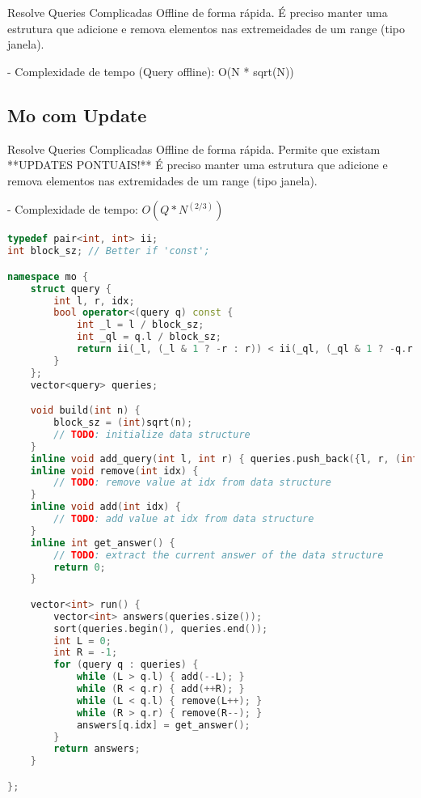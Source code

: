 \documentclass[11pt, a4paper, twoside]{article}
\begin{document}
Resolve Queries Complicadas Offline de forma rápida.  
É preciso manter uma estrutura que adicione e remova elementos nas extremeidades de um range (tipo janela).

- Complexidade de tempo (Query offline): O(N * sqrt(N))

\subsection{Mo com Update}


Resolve Queries Complicadas Offline de forma rápida.   
Permite que existam **UPDATES PONTUAIS!**  
É preciso manter uma estrutura que adicione e remova elementos nas extremidades de um range (tipo janela).

- Complexidade de tempo: $O(Q * N^(2/3))$

\begin{lstlisting}[language=C++]
typedef pair<int, int> ii;
int block_sz; // Better if 'const';

namespace mo {
    struct query {
        int l, r, idx;
        bool operator<(query q) const {
            int _l = l / block_sz;
            int _ql = q.l / block_sz;
            return ii(_l, (_l & 1 ? -r : r)) < ii(_ql, (_ql & 1 ? -q.r : q.r));
        }
    };
    vector<query> queries;

    void build(int n) {
        block_sz = (int)sqrt(n);
        // TODO: initialize data structure
    }
    inline void add_query(int l, int r) { queries.push_back({l, r, (int)queries.size()}); }
    inline void remove(int idx) {
        // TODO: remove value at idx from data structure
    }
    inline void add(int idx) {
        // TODO: add value at idx from data structure
    }
    inline int get_answer() {
        // TODO: extract the current answer of the data structure
        return 0;
    }

    vector<int> run() {
        vector<int> answers(queries.size());
        sort(queries.begin(), queries.end());
        int L = 0;
        int R = -1;
        for (query q : queries) {
            while (L > q.l) { add(--L); }
            while (R < q.r) { add(++R); }
            while (L < q.l) { remove(L++); }
            while (R > q.r) { remove(R--); }
            answers[q.idx] = get_answer();
        }
        return answers;
    }

};
\end{lstlisting}
\end{document}
